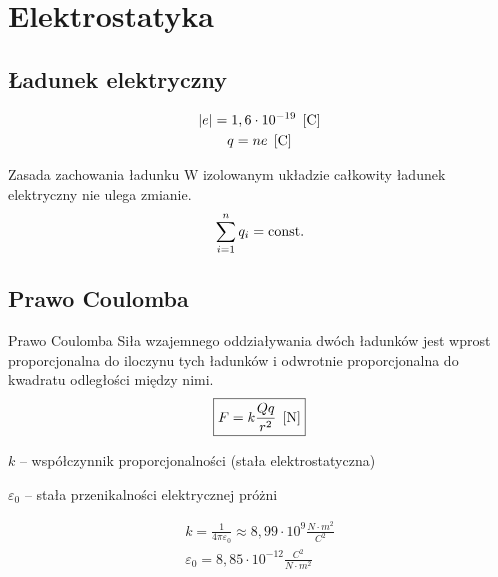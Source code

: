 \chapter{Elektrostatyka}

\section{Ładunek elektryczny}
\begin{gather*}
  |e| = 1,6\cdot 10^{-19} \;\left[\mathrm{C}\right]\\
  q = ne \;\left[\mathrm{C}\right]
\end{gather*}

\begin{law}{Zasada zachowania ładunku}
  W izolowanym układzie całkowity ładunek elektryczny nie ulega zmianie.
  \begin{equation}
    \sum_{i=1}^n q_i = \operatorname{const.}
  \end{equation}
\end{law}

\section{Prawo Coulomba}
\begin{law}{Prawo Coulomba}
  Siła wzajemnego oddziaływania dwóch ładunków jest wprost proporcjonalna do iloczynu tych ładunków
  i odwrotnie proporcjonalna do kwadratu odległości między nimi.
  \begin{equation}\label{coulomb}
    \boxed{F = k \frac{Qq}{r^2} \;\left[\mathrm{N}\right]}
  \end{equation}
  \begin{symbols}
    \item $k$ -- współczynnik proporcjonalności (stała elektrostatyczna)
    \item $\varepsilon_0$ -- stała przenikalności elektrycznej próżni
  \end{symbols}
  \begin{gather*}
    k = \frac{1}{4\pi\varepsilon_0} \approx 8,99 \cdot 10^9 \unit{\frac{N \cdot m^2}{C^2}}\\[0.5em]
    \varepsilon_0 = 8,85 \cdot 10^{-12} \unit{\frac{C^2}{N \cdot m^2}}
  \end{gather*}
\end{law}

